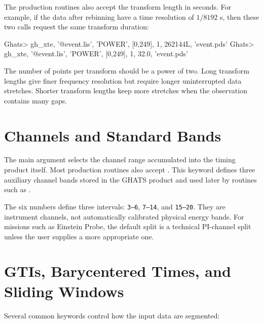 The production routines also accept the transform length in seconds.  For
example, if the data after rebinning have a time resolution of \(1/8192\) s,
then these two calls request the same transform duration:

\begin{ghatsconsole}
Ghats> gh_xte, '@event.lis', 'POWER', [0,249], 1, 262144L, 'event.pds'
Ghats> gh_xte, '@event.lis', 'POWER', [0,249], 1, 32.0,    'event.pds'
\end{ghatsconsole}

\begin{ghatsnote}
The number of points per transform should be a power of two.  Long transform
lengths give finer frequency resolution but require longer uninterrupted data
stretches.  Shorter transform lengths keep more stretches when the observation
contains many gaps.
\end{ghatsnote}

\section{Channels and Standard Bands}

The main  argument selects the channel range accumulated into
the timing product itself.  Most production routines also accept
.  This keyword defines three auxiliary channel bands stored in
the GHATS product and used later by routines such as .


The six numbers define three intervals: \texttt{3--6}, \texttt{7--14}, and
\texttt{15--20}.  They are instrument channels, not automatically calibrated
physical energy bands.  For missions such as Einstein Probe, the default
split is a technical PI-channel split unless the user supplies a more
appropriate one.

\section{GTIs, Barycentered Times, and Sliding Windows}

Several common keywords control how the input data are segmented:

